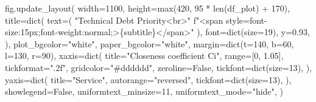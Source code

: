 \documentclass[
  12pt,
  letterpaper,
  12pt,
  oneside,
  english,
  onehalfspacing,
  headsepline]{MastersDoctoralThesis}
\newenvironment{Shaded}{\begin{snugshade}}{\end{snugshade}}
\newcommand{\BuiltInTok}[1]{\textcolor[rgb]{0.00,0.23,0.31}{#1}}
\newcommand{\DecValTok}[1]{\textcolor[rgb]{0.68,0.00,0.00}{#1}}
\newcommand{\FloatTok}[1]{\textcolor[rgb]{0.68,0.00,0.00}{#1}}
\newcommand{\NormalTok}[1]{\textcolor[rgb]{0.00,0.23,0.31}{#1}}
\newcommand{\OperatorTok}[1]{\textcolor[rgb]{0.37,0.37,0.37}{#1}}
\newcommand{\SpecialCharTok}[1]{\textcolor[rgb]{0.37,0.37,0.37}{#1}}
\newcommand{\SpecialStringTok}[1]{\textcolor[rgb]{0.13,0.47,0.30}{#1}}
\newcommand{\StringTok}[1]{\textcolor[rgb]{0.13,0.47,0.30}{#1}}
\newcommand{\VariableTok}[1]{\textcolor[rgb]{0.07,0.07,0.07}{#1}}
\begin{document}
\begin{Shaded}
\begin{Highlighting}[]
\NormalTok{    fig.update\_layout(}
\NormalTok{        width}\OperatorTok{=}\DecValTok{1100}\NormalTok{,}
\NormalTok{        height}\OperatorTok{=}\BuiltInTok{max}\NormalTok{(}\DecValTok{420}\NormalTok{, }\DecValTok{95} \OperatorTok{*} \BuiltInTok{len}\NormalTok{(df\_plot) }\OperatorTok{+} \DecValTok{170}\NormalTok{),}
\NormalTok{        title}\OperatorTok{=}\BuiltInTok{dict}\NormalTok{(}
\NormalTok{            text}\OperatorTok{=}\NormalTok{(}
                \StringTok{"Technical Debt Priority\textless{}br\textgreater{}"}
                \SpecialStringTok{f"\textless{}span style=\textquotesingle{}font{-}size:15px;font{-}weight:normal;\textquotesingle{}\textgreater{}}\SpecialCharTok{\{}\NormalTok{subtitle}\SpecialCharTok{\}}\SpecialStringTok{\textless{}/span\textgreater{}"}
\NormalTok{            ),}
\NormalTok{            font}\OperatorTok{=}\BuiltInTok{dict}\NormalTok{(size}\OperatorTok{=}\DecValTok{19}\NormalTok{),}
\NormalTok{            y}\OperatorTok{=}\FloatTok{0.93}\NormalTok{,}
\NormalTok{        ),}
\NormalTok{        plot\_bgcolor}\OperatorTok{=}\StringTok{"white"}\NormalTok{,}
\NormalTok{        paper\_bgcolor}\OperatorTok{=}\StringTok{"white"}\NormalTok{,}
\NormalTok{        margin}\OperatorTok{=}\BuiltInTok{dict}\NormalTok{(t}\OperatorTok{=}\DecValTok{140}\NormalTok{, b}\OperatorTok{=}\DecValTok{60}\NormalTok{, l}\OperatorTok{=}\DecValTok{130}\NormalTok{, r}\OperatorTok{=}\DecValTok{90}\NormalTok{),}
\NormalTok{        xaxis}\OperatorTok{=}\BuiltInTok{dict}\NormalTok{(}
\NormalTok{            title}\OperatorTok{=}\StringTok{"Closeness coefficient Ci"}\NormalTok{,}
            \BuiltInTok{range}\OperatorTok{=}\NormalTok{[}\DecValTok{0}\NormalTok{, }\FloatTok{1.05}\NormalTok{],}
\NormalTok{            tickformat}\OperatorTok{=}\StringTok{".2f"}\NormalTok{,}
\NormalTok{            gridcolor}\OperatorTok{=}\StringTok{"\#dddddd"}\NormalTok{,}
\NormalTok{            zeroline}\OperatorTok{=}\VariableTok{False}\NormalTok{,}
\NormalTok{            tickfont}\OperatorTok{=}\BuiltInTok{dict}\NormalTok{(size}\OperatorTok{=}\DecValTok{13}\NormalTok{),}
\NormalTok{        ),}
\NormalTok{        yaxis}\OperatorTok{=}\BuiltInTok{dict}\NormalTok{(}
\NormalTok{            title}\OperatorTok{=}\StringTok{"Service"}\NormalTok{,}
\NormalTok{            autorange}\OperatorTok{=}\StringTok{"reversed"}\NormalTok{,}
\NormalTok{            tickfont}\OperatorTok{=}\BuiltInTok{dict}\NormalTok{(size}\OperatorTok{=}\DecValTok{13}\NormalTok{),}
\NormalTok{        ),}
\NormalTok{        showlegend}\OperatorTok{=}\VariableTok{False}\NormalTok{,}
\NormalTok{        uniformtext\_minsize}\OperatorTok{=}\DecValTok{11}\NormalTok{,}
\NormalTok{        uniformtext\_mode}\OperatorTok{=}\StringTok{"hide"}\NormalTok{,}
\NormalTok{    )}


\end{Highlighting}
\end{Shaded}
\end{document}
